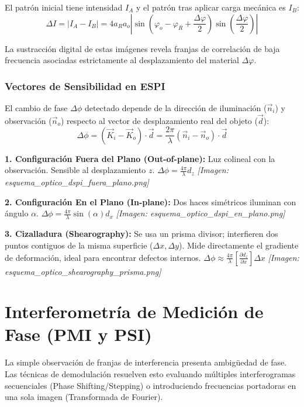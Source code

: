 \documentclass[12pt]{article}
\begin{document}
	El patrón inicial tiene intensidad $I_A$ y el patrón tras aplicar carga mecánica es $I_B$:
	\begin{equation*}
		\Delta I = |I_A - I_B| = 4 a_R a_o \left| \sin\left(\varphi_o - \varphi_R + \frac{\Delta\varphi}{2}\right) \sin\left(\frac{\Delta\varphi}{2}\right) \right|
	\end{equation*}
	
	La sustracción digital de estas imágenes revela franjas de correlación de baja frecuencia asociadas estrictamente al desplazamiento del material $\Delta\varphi$.
	
	\subsubsection*{Vectores de Sensibilidad en ESPI}
	El cambio de fase $\Delta\phi$ detectado depende de la dirección de iluminación ($\vec{n}_i$) y observación ($\vec{n}_o$) respecto al vector de desplazamiento real del objeto ($\vec{d}$):
	\begin{equation*}
		\Delta\phi = (\vec{K}_i - \vec{K}_o)\cdot\vec{d} = \frac{2\pi}{\lambda}(\vec{n}_i - \vec{n}_o)\cdot\vec{d}
	\end{equation*}
	
	\textbf{1. Configuración Fuera del Plano (Out-of-plane):} Luz colineal con la observación. Sensible al desplazamiento $z$.
	$\Delta\phi = \frac{4\pi}{\lambda}d_z$
	\textit{[Imagen: esquema\_optico\_dspi\_fuera\_plano.png]}
	
	\textbf{2. Configuración En el Plano (In-plane):} Dos haces simétricos iluminan con ángulo $\alpha$.
	$\Delta\phi = \frac{4\pi}{\lambda} \sin(\alpha) d_x$
	\textit{[Imagen: esquema\_optico\_dspi\_en\_plano.png]}
	
	\textbf{3. Cizalladura (Shearography):} Se usa un prisma divisor; interfieren dos puntos contiguos de la misma superficie ($\Delta x, \Delta y$). Mide directamente el gradiente de deformación, ideal para encontrar defectos internos.
	$\Delta\phi \approx \frac{4\pi}{\lambda} \left[ \frac{\partial d_z}{\partial x} \right] \Delta x$
	\textit{[Imagen: esquema\_optico\_shearography\_prisma.png]}
	
	\section{Interferometría de Medición de Fase (PMI y PSI)}
	La simple observación de franjas de interferencia presenta ambigüedad de fase. Las técnicas de demodulación resuelven esto evaluando múltiples interferogramas secuenciales (Phase Shifting/Stepping) o introduciendo frecuencias portadoras en una sola imagen (Transformada de Fourier).
	
\end{document}
